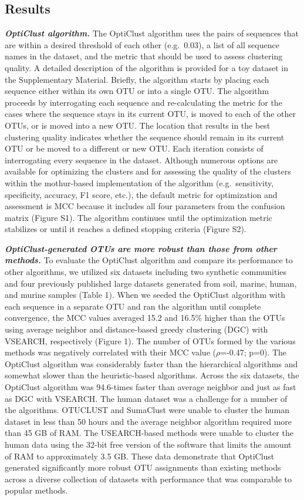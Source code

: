 \documentclass[11pt,]{article}
\begin{document}
\subsection{Results}\label{results}

\textbf{\emph{OptiClust algorithm.}} The OptiClust algorithm uses the
pairs of sequences that are within a desired threshold of each other
(e.g.~0.03), a list of all sequence names in the dataset, and the metric
that should be used to assess clustering quality. A detailed description
of the algorithm is provided for a toy dataset in the Supplementary
Material. Briefly, the algorithm starts by placing each sequence either
within its own OTU or into a single OTU. The algorithm proceeds by
interrogating each sequence and re-calculating the metric for the cases
where the sequence stays in its current OTU, is moved to each of the
other OTUs, or is moved into a new OTU. The location that results in the
best clustering quality indicates whether the sequence should remain in
its current OTU or be moved to a different or new OTU. Each iteration
consists of interrogating every sequence in the dataset. Although
numerous options are available for optimizing the clusters and for
assessing the quality of the clusters within the mothur-based
implementation of the algorithm (e.g.~sensitivity, specificity,
accuracy, F1 score, etc.), the default metric for optimization and
assessment is MCC because it includes all four parameters from the
confusion matrix (Figure S1). The algorithm continues until the
optimization metric stabilizes or until it reaches a defined stopping
criteria (Figure S2).

\textbf{\emph{OptiClust-generated OTUs are more robust than those from
other methods.}} To evaluate the OptiClust algorithm and compare its
performance to other algorithms, we utilized six datasets including two
synthetic communities and four previously published large datasets
generated from soil, marine, human, and murine samples (Table 1). When
we seeded the OptiClust algorithm with each sequence in a separate OTU
and ran the algorithm until complete convergence, the MCC values
averaged 15.2 and 16.5\% higher than the OTUs using average neighbor and
distance-based greedy clustering (DGC) with VSEARCH, respectively
(Figure 1). The number of OTUs formed by the various methods was
negatively correlated with their MCC value (\(\rho\)=-0.47; p=0). The
OptiClust algorithm was considerably faster than the hierarchical
algorithms and somewhat slower than the heuristic-based algorithms.
Across the six datasets, the OptiClust algorithm was 94.6-times faster
than average neighbor and just as fast as DGC with VSEARCH. The human
dataset was a challenge for a number of the algorithms. OTUCLUST and
SumaClust were unable to cluster the human dataset in less than 50 hours
and the average neighbor algorithm required more than 45 GB of RAM. The
USEARCH-based methods were unable to cluster the human data using the
32-bit free version of the software that limits the amount of RAM to
approximately 3.5 GB. These data demonstrate that OptiClust generated
significantly more robust OTU assignments than existing methods across a
diverse collection of datasets with performance that was comparable to
popular methods.
\end{document}

